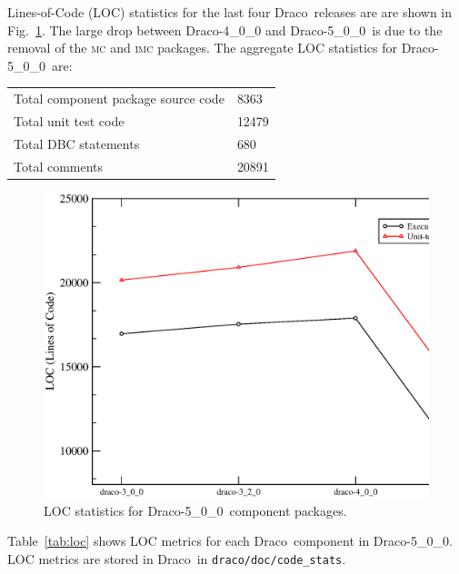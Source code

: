 \documentclass[note]{ResearchNote}
\newcommand{\draco}{Draco}
\newcommand{\dracor}{\draco-5\_0\_0}
\begin{document}
Lines-of-Code (LOC) statistics for the last four \draco\ releases are
are shown in Fig.~\ref{fig:stats}.  The large drop between
\draco-4\_0\_0 and \dracor\ is due to the removal of the \textsc{mc}
and \textsc{imc} packages. The aggregate LOC statistics for \dracor\ 
are:
\begin{center}
  \begin{tabular}{|l|l|} \hline
    Total component package source code & 8363 \\
    Total unit test code & 12479 \\
    Total DBC statements & 680 \\
    Total comments & 20891 \\
    \hline
  \end{tabular}
\end{center}
\begin{figure}
  \label{fig:stats}
  \centerline{
    \includegraphics[width=6in]{loc-5_0_0.eps}}
  \caption{LOC statistics for \dracor\ component packages.}
\end{figure}
Table~\ref{tab:loc} shows LOC metrics for each \draco\ component in
\dracor.  LOC metrics are stored in \draco\ in
\texttt{draco/doc/code\_stats}.
\end{document}
